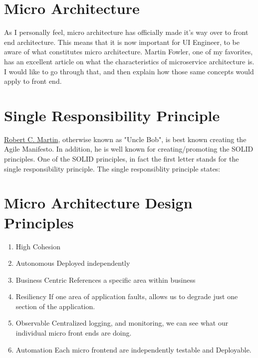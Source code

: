 \section{Micro Architecture}
As I personally feel, micro architecture has officially made it's way over to front end architecture. This means that it is now important for UI Engineer, to be aware of what constitutes micro architecture. Martin Fowler, one of my favorites, has an excellent article on what the characteristics of microservice architecture is. I would like to go through that, and then explain how those same concepts would apply to front end. 

\section{Single Responsibility Principle}
\href{https://en.wikipedia.org/wiki/Robert_C._Martin}{Robert C. Martin}, otherwise known as "Uncle Bob", is best known creating the Agile Manifesto. In addition, he is well known for creating/promoting the SOLID principles. One of the SOLID principles, in fact the first letter stands for the single responsibility principle. The single responsiblity principle states:

\begin{quote}
\end{quote}

\section{Micro Architecture Design Principles}
\begin{enumerate}
  \item High Cohesion 
  \item Autonomous 
Deployed independently 
  \item Business Centric
References a specific area within business 
  \item Resiliency 
If one area of application faults, allows us to degrade just one section of the application. 
  \item Observable 
Centralized logging, and monitoring, we can see what our individual micro front ends are doing.
  \item Automation 
Each micro frontend are independently testable and Deployable. 
\end{enumerate}

